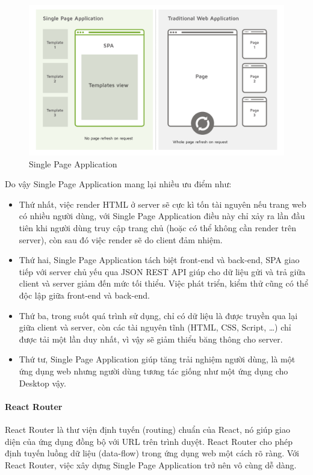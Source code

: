 \begin{figure}[H]
\centering
\includegraphics[width=\textwidth]{images/single-page-app.png}
\caption{Single Page Application }
\label{fig:spa}
\end{figure}

Do vậy Single Page Application mang lại nhiều ưu điểm như:
\begin{itemize}[topsep=0ex]
\item Thứ nhất, việc render HTML ở server sẽ cực kì tốn
    tài nguyên nếu trang web có nhiều người dùng, với Single Page
    Application điều này chỉ xảy ra lần đầu tiên khi người dùng
    truy cập trang chủ (hoặc có thể không cần render trên server),
    còn sau đó việc render sẽ do client đảm nhiệm. 

\item Thứ hai, Single Page Application tách biệt front-end và
    back-end, SPA giao tiếp với server chủ yếu qua JSON REST API
    giúp cho dữ liệu gửi và trả giữa client và server giảm
    đến mức tối thiểu. Việc phát triển, kiểm thử cũng có thể
    độc lập giữa front-end và back-end. 

\item Thứ ba, trong suốt quá trình sử dụng, chỉ có dữ liệu là
    được truyền qua lại giữa client và server, còn các tài
    nguyên tĩnh (HTML, CSS, Script, …) chỉ được tải một
    lần duy nhất, vì vậy sẽ giảm thiểu băng thông cho server. 

\item Thứ tư, Single Page Application giúp tăng trải nghiệm người
    dùng, là một ứng dụng web nhưng người dùng tương tác
    giống như một ứng dụng cho Desktop vậy.
\end{itemize}

\paragraph{React Router}
React Router là thư viện định tuyến (routing) chuẩn của React,
nó giúp giao diện của ứng dụng đồng bộ với URL trên trình duyệt.
React Router cho phép định tuyến luồng dữ liệu (data-flow) trong
ứng dụng web một cách rõ ràng. Với React Router, việc xây dựng
Single Page Application trở nên vô cùng dễ dàng.

